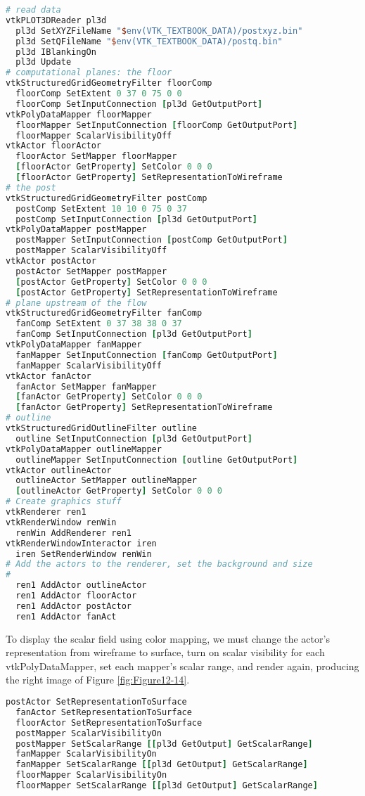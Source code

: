 \begin{lstlisting}[language=TCL, caption={Display the computational grid.}]
# read data
vtkPLOT3DReader pl3d
  pl3d SetXYZFileName "$env(VTK_TEXTBOOK_DATA)/postxyz.bin"
  pl3d SetQFileName "$env(VTK_TEXTBOOK_DATA)/postq.bin"
  pl3d IBlankingOn
  pl3d Update
# computational planes: the floor
vtkStructuredGridGeometryFilter floorComp
  floorComp SetExtent 0 37 0 75 0 0
  floorComp SetInputConnection [pl3d GetOutputPort]
vtkPolyDataMapper floorMapper
  floorMapper SetInputConnection [floorComp GetOutputPort]
  floorMapper ScalarVisibilityOff
vtkActor floorActor
  floorActor SetMapper floorMapper
  [floorActor GetProperty] SetColor 0 0 0
  [floorActor GetProperty] SetRepresentationToWireframe
# the post
vtkStructuredGridGeometryFilter postComp
  postComp SetExtent 10 10 0 75 0 37
  postComp SetInputConnection [pl3d GetOutputPort]
vtkPolyDataMapper postMapper
  postMapper SetInputConnection [postComp GetOutputPort]
  postMapper ScalarVisibilityOff
vtkActor postActor
  postActor SetMapper postMapper
  [postActor GetProperty] SetColor 0 0 0
  [postActor GetProperty] SetRepresentationToWireframe
# plane upstream of the flow
vtkStructuredGridGeometryFilter fanComp
  fanComp SetExtent 0 37 38 38 0 37
  fanComp SetInputConnection [pl3d GetOutputPort]
vtkPolyDataMapper fanMapper
  fanMapper SetInputConnection [fanComp GetOutputPort]
  fanMapper ScalarVisibilityOff
vtkActor fanActor
  fanActor SetMapper fanMapper
  [fanActor GetProperty] SetColor 0 0 0
  [fanActor GetProperty] SetRepresentationToWireframe
# outline
vtkStructuredGridOutlineFilter outline
  outline SetInputConnection [pl3d GetOutputPort]
vtkPolyDataMapper outlineMapper
  outlineMapper SetInputConnection [outline GetOutputPort]
vtkActor outlineActor
  outlineActor SetMapper outlineMapper
  [outlineActor GetProperty] SetColor 0 0 0
# Create graphics stuff
vtkRenderer ren1
vtkRenderWindow renWin
  renWin AddRenderer ren1
vtkRenderWindowInteractor iren
  iren SetRenderWindow renWin
# Add the actors to the renderer, set the background and size
#
  ren1 AddActor outlineActor
  ren1 AddActor floorActor
  ren1 AddActor postActor
  ren1 AddActor fanAct
\end{lstlisting}

To display the scalar field using color mapping, we must change the
actor's representation from wireframe to surface, turn on scalar
visibility for each vtkPolyDataMapper, set each mapper's scalar
range, and render again, producing the right image of Figure \ref{fig:Figure12-14}.

\begin{lstlisting}[language=TCL, caption={Dicplay the scalar field.}]
  postActor SetRepresentationToSurface
  fanActor SetRepresentationToSurface
  floorActor SetRepresentationToSurface
  postMapper ScalarVisibilityOn
  postMapper SetScalarRange [[pl3d GetOutput] GetScalarRange]
  fanMapper ScalarVisibilityOn
  fanMapper SetScalarRange [[pl3d GetOutput] GetScalarRange]
  floorMapper ScalarVisibilityOn
  floorMapper SetScalarRange [[pl3d GetOutput] GetScalarRange]
\end{lstlisting}

